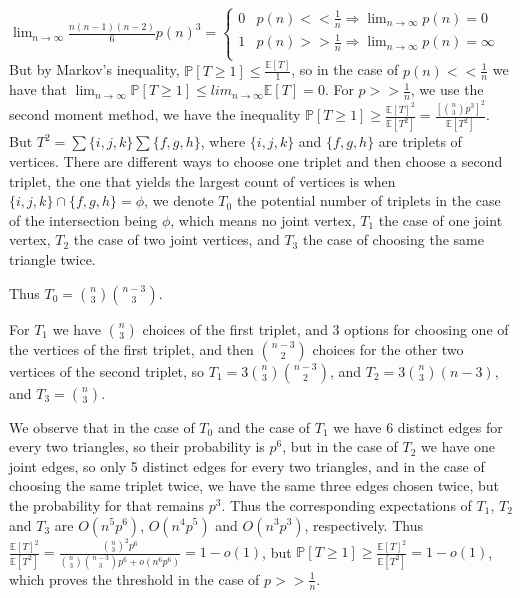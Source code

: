 \documentclass{article}
\begin{document}
$\lim_{n\rightarrow\infty}\frac{n(n-1)(n-2)}{6}p(n)^3=     \begin{cases}
       0 & p(n)<<\frac{1}{n}\Rightarrow{\lim_{n\rightarrow\infty}p(n)}=0\\
       1 & p(n)>>\frac{1}{n}\Rightarrow{\lim_{n\rightarrow\infty}p(n)}=\infty\\
     \end{cases}$
But by Markov's inequality, $\mathbb{P}[T\geq{1}]\leq\frac{\mathbb{E}[T]}{1}$, so in the case of $p(n)<<\frac{1}{n}$ we have that $\lim_{n\rightarrow\infty}\mathbb{P}[T\geq{1}]\leq{lim_{n\rightarrow\infty}\mathbb{E}[T]=0}$.
For $p>>\frac{1}{n}$, we use the second moment method, we have the inequality $\mathbb{P}[T\geq{1}]\geq{\frac{\mathbb{E}[T]^2}{\mathbb{E}[T^2]}}=\frac{[\binom{n}{3}p^3]^2}{\mathbb{E}[T^2]}$. But $T^2=\sum\{i,j,k\}\sum\{f,g,h\}$, where $\{i,j,k\}$ and $\{f,g,h\}$ are triplets of vertices. There are different ways to choose one triplet and then choose a second triplet, the one that yields the largest count of vertices is when $\{i,j,k\}\cap\{f,g,h\}=\phi$, we denote $T_0$ the potential number of triplets in the case of the intersection being $\phi$, which means no joint vertex, $T_1$ the case of one joint vertex, $T_2$ the case of two joint vertices, and $T_3$ the case of choosing the same triangle twice.

Thus $T_0=\binom{n}{3}\binom{n-3}{3}$. 

For $T_1$ we have $\binom{n}{3}$ choices of the first triplet, and $3$ options for choosing one of the vertices of the first triplet, and then $\binom{n-3}{2}$ choices for the other two vertices of the second triplet, so $T_1=3\binom{n}{3}\binom{n-3}{2}$, and $T_2=3\binom{n}{3}(n-3)$, and $T_3=\binom{n}{3}$. 

We observe that in the case of $T_0$ and the case of $T_1$ we have $6$ distinct edges for every two triangles, so their probability is $p^6$, but in the case of $T_2$ we have one joint edges, so only 5 distinct edges for every two triangles, and in the case of choosing the same triplet twice, we have the same three edges chosen twice, but the probability for that remains $p^3$. Thus the corresponding expectations of $T_1$, $T_2$ and $T_3$ are $O(n^5p^6)$, $O(n^4p^5)$ and $O(n^3p^3)$, respectively. Thus $\frac{\mathbb{E}[T]^2}{\mathbb{E}[T^2]}=\frac{\binom{n}{3}^2p^6}{\binom{n}{3}\binom{n-3}{3}p^6+o(n^6p^6)}=1-o(1)$, but $\mathbb{P}[T\geq{1}]\geq\frac{\mathbb{E}[T]^2}{\mathbb{E}[T^2]}=1-o(1)$, which proves the threshold in the case of $p>>\frac{1}{n}$.
\end{document}
